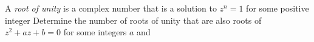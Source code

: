 A \textit{root of unity} is a complex number that is a solution to $ z^n = 1$ for some positive integer  Determine the number of roots of unity that are also roots of $ z^2 + az + b = 0$ for some integers $ a$ and 